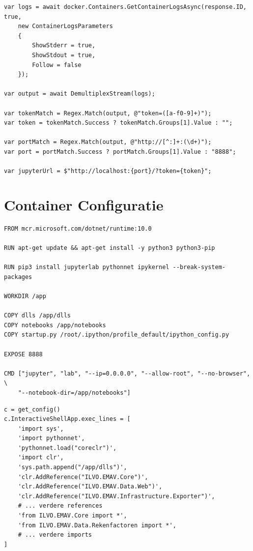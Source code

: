 \begin{listing}[ht]
\begin{verbatim}
var logs = await docker.Containers.GetContainerLogsAsync(response.ID, true,
    new ContainerLogsParameters 
    { 
        ShowStderr = true, 
        ShowStdout = true, 
        Follow = false 
    });

var output = await DemultiplexStream(logs);

var tokenMatch = Regex.Match(output, @"token=([a-f0-9]+)");
var token = tokenMatch.Success ? tokenMatch.Groups[1].Value : "";

var portMatch = Regex.Match(output, @"http://[^:]+:(\d+)");
var port = portMatch.Success ? portMatch.Groups[1].Value : "8888";

var jupyterUrl = $"http://localhost:{port}/?token={token}";
\end{verbatim}
\caption[Extractie van de Jupyter-token en poort uit logs.]{Extractie van de Jupyter-token en poort uit de container-logs.}
\label{lst:docker_logs}
\end{listing}

\section{Container Configuratie}
\label{app:container_config}

\begin{listing}[ht]
\begin{verbatim}
FROM mcr.microsoft.com/dotnet/runtime:10.0

RUN apt-get update && apt-get install -y python3 python3-pip

RUN pip3 install jupyterlab pythonnet ipykernel --break-system-packages

WORKDIR /app

COPY dlls /app/dlls
COPY notebooks /app/notebooks
COPY startup.py /root/.ipython/profile_default/ipython_config.py

EXPOSE 8888

CMD ["jupyter", "lab", "--ip=0.0.0.0", "--allow-root", "--no-browser", \
    "--notebook-dir=/app/notebooks"]
\end{verbatim}
\caption[Dockerfile voor de Jupyter-omgeving.]{Dockerfile voor de Jupyter-omgeving met .NET-ondersteuning.}
\label{lst:dockerfile}
\end{listing}

\begin{listing}[ht]
\begin{verbatim}
c = get_config()
c.InteractiveShellApp.exec_lines = [
    'import sys',
    'import pythonnet',
    'pythonnet.load("coreclr")',
    'import clr',
    'sys.path.append("/app/dlls")',
    'clr.AddReference("ILVO.EMAV.Core")',
    'clr.AddReference("ILVO.EMAV.Data.Web")',
    'clr.AddReference("ILVO.EMAV.Infrastructure.Exporter")',
    # ... verdere references
    'from ILVO.EMAV.Core import *',
    'from ILVO.EMAV.Data.Rekenfactoren import *',
    # ... verdere imports
]
\end{verbatim}
\caption[Startup-script voor IPython.]{Startup-script voor IPython voor het automatisch inladen van .NET-assemblies.}
\label{lst:startuppy}
\end{listing}

